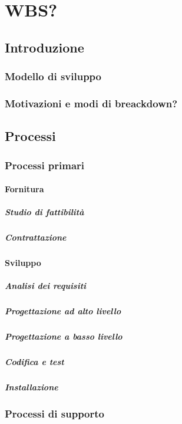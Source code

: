 \section {WBS?}
	\subsection {Introduzione}
		\subsubsection {Modello di sviluppo}
		\subsubsection {Motivazioni e modi di breackdown?}
	\subsection{Processi}
		\subsubsection {Processi primari}
			\paragraph {Fornitura}
				\subparagraph {Studio di fattibilità}
				\subparagraph {Contrattazione}
			\paragraph {Sviluppo}
				\subparagraph {Analisi dei requisiti}
				\subparagraph {Progettazione ad alto livello}
				\subparagraph {Progettazione a basso livello}
				\subparagraph {Codifica e test}
				\subparagraph {Installazione}
		\subsubsection {Processi di supporto}
